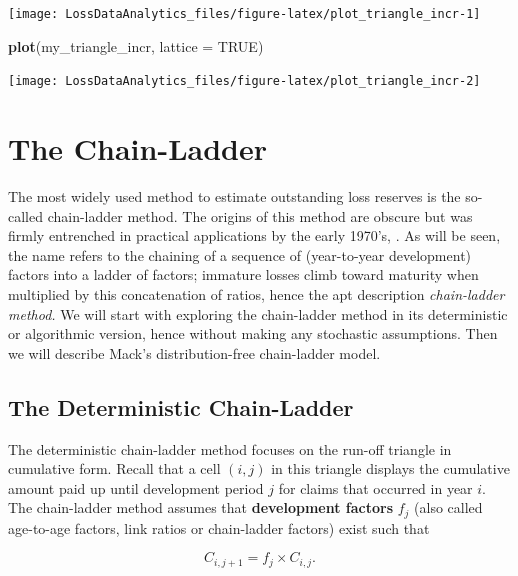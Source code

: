\documentclass[]{book}
\newenvironment{Shaded}{\begin{snugshade}}{\end{snugshade}}
\newcommand{\KeywordTok}[1]{\textcolor[rgb]{0.13,0.29,0.53}{\textbf{#1}}}
\newcommand{\DataTypeTok}[1]{\textcolor[rgb]{0.13,0.29,0.53}{#1}}
\newcommand{\OtherTok}[1]{\textcolor[rgb]{0.56,0.35,0.01}{#1}}
\newcommand{\NormalTok}[1]{#1}
\begin{document}
\begin{center}\texttt{[image: LossDataAnalytics\_files/figure-latex/plot\_triangle\_incr-1]} \end{center}

\begin{Shaded}
\begin{Highlighting}[]
\KeywordTok{plot}\NormalTok{(my_triangle_incr, }\DataTypeTok{lattice =} \OtherTok{TRUE}\NormalTok{)}
\end{Highlighting}
\end{Shaded}

\begin{center}\texttt{[image: LossDataAnalytics\_files/figure-latex/plot\_triangle\_incr-2]} \end{center}

\section{The Chain-Ladder}\label{S:Chain-ladder}

The most widely used method to estimate outstanding loss reserves is the
so-called chain-ladder method. The origins of this method are obscure
but was firmly entrenched in practical applications by the early 1970's,
\citet{taylor1986claims}. As will be seen, the name refers to the
chaining of a sequence of (year-to-year development) factors into a
ladder of factors; immature losses climb toward maturity when multiplied
by this concatenation of ratios, hence the apt description
\emph{chain-ladder method.} We will start with exploring the
chain-ladder method in its deterministic or algorithmic version, hence
without making any stochastic assumptions. Then we will describe Mack's
distribution-free chain-ladder model.

\subsection{The Deterministic Chain-Ladder}\label{S:DeterministicCL}

The deterministic chain-ladder method focuses on the run-off triangle in
cumulative form. Recall that a cell \((i,j)\) in this triangle displays
the cumulative amount paid up until development period \(j\) for claims
that occurred in year \(i\). The chain-ladder method assumes that
\textbf{development factors} \(f_j\) (also called age-to-age factors,
link ratios or chain-ladder factors) exist such that

\[
C_{i,j+1} = f_j \times C_{i,j}.
\]
\end{document}
